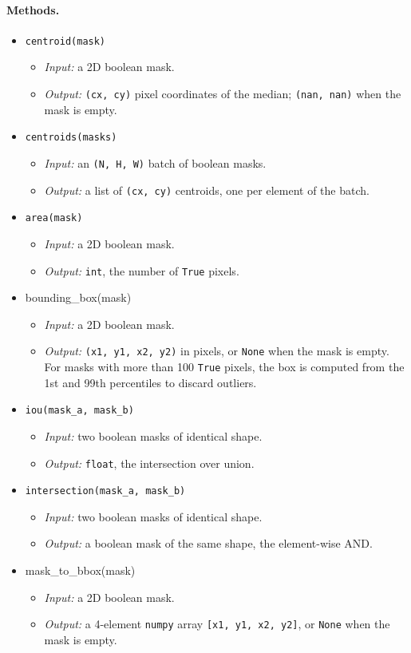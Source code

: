 \documentclass{llmxive}
\providecommand{\apicode}[1]{#1}
\begin{document}
\paragraph{Methods.}
\begin{itemize}[leftmargin=1.5em]
\item \texttt{centroid(mask)}
  \begin{itemize}
  \item \emph{Input:} a 2D boolean mask.
  \item \emph{Output:} \texttt{(cx, cy)} pixel coordinates of the median; \texttt{(nan, nan)} when the mask is empty.
  \end{itemize}
\item \texttt{centroids(masks)}
  \begin{itemize}
  \item \emph{Input:} an \texttt{(N, H, W)} batch of boolean masks.
  \item \emph{Output:} a list of \texttt{(cx, cy)} centroids, one per element of the batch.
  \end{itemize}
\item \texttt{area(mask)}
  \begin{itemize}
  \item \emph{Input:} a 2D boolean mask.
  \item \emph{Output:} \texttt{int}, the number of \texttt{True} pixels.
  \end{itemize}
\item \apicode{bounding_box(mask)}
  \begin{itemize}
  \item \emph{Input:} a 2D boolean mask.
  \item \emph{Output:} \texttt{(x1, y1, x2, y2)} in pixels, or \texttt{None} when the mask is empty. For masks with more than 100 \texttt{True} pixels, the box is computed from the 1st and 99th percentiles to discard outliers.
  \end{itemize}
\item \texttt{iou(mask\_a, mask\_b)}
  \begin{itemize}
  \item \emph{Input:} two boolean masks of identical shape.
  \item \emph{Output:} \texttt{float}, the intersection over union.
  \end{itemize}
\item \texttt{intersection(mask\_a, mask\_b)}
  \begin{itemize}
  \item \emph{Input:} two boolean masks of identical shape.
  \item \emph{Output:} a boolean mask of the same shape, the element-wise AND.
  \end{itemize}
\item \apicode{mask_to_bbox(mask)}
  \begin{itemize}
  \item \emph{Input:} a 2D boolean mask.
  \item \emph{Output:} a 4-element \texttt{numpy} array \texttt{[x1, y1, x2, y2]}, or \texttt{None} when the mask is empty.
  \end{itemize}
\end{itemize}
\end{document}
